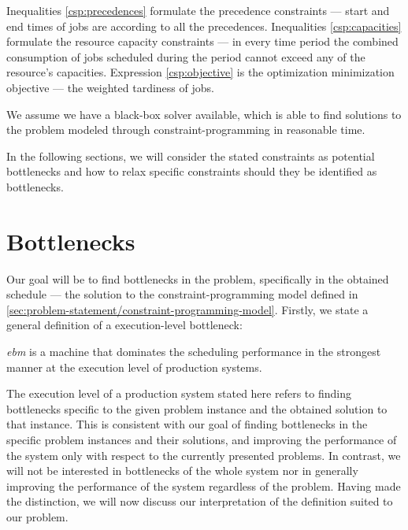 Inequalities \eqref{csp:precedences} formulate the precedence constraints --- start and end times of jobs
are according to all the precedences.
Inequalities \eqref{csp:capacities} formulate the resource capacity constraints --- in every time period
the combined consumption of jobs scheduled during the period cannot exceed any of the resource's capacities.
Expression \eqref{csp:objective} is the optimization minimization objective --- the weighted tardiness of jobs.

We assume we have a black-box solver available,
which is able to find solutions to the problem modeled through constraint-programming in reasonable time.

In the following sections, we will consider the stated constraints as potential bottlenecks
and how to relax specific constraints should they be identified as bottlenecks.

\section{Bottlenecks} \label{sec:problem-statement/bottlenecks}

Our goal will be to find bottlenecks in the problem, specifically in the obtained schedule
--- the solution to the constraint-programming model defined in \cref{sec:problem-statement/constraint-programming-model}.
Firstly, we state a general definition of a execution-level bottleneck:

\begin{defn*}\label{def:bottleneck}
    \emph{\ac{ebm}} is a machine that dominates the scheduling performance in the strongest manner
    at the execution level of production systems.
\end{defn*}

The execution level of a production system stated here refers to finding bottlenecks
specific to the given problem instance and the obtained solution to that instance.
This is consistent with our goal of finding bottlenecks in the specific problem instances and their solutions,
and improving the performance of the system only with respect to the currently presented problems.
In contrast, we will not be interested in bottlenecks of the whole system
nor in generally improving the performance of the system regardless of the problem.
Having made the distinction, we will now discuss our interpretation of the definition suited to our problem.

